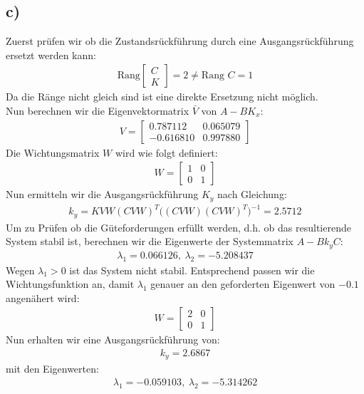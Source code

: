 \documentclass[11pt]{scrartcl} %
\begin{document}
\subsection*{c)}
Zuerst prüfen wir ob die Zustandsrückführung durch eine Ausgangsrückführung ersetzt werden kann:
\begin{align*}
	\text{Rang}\begin{bmatrix}C\\K\end{bmatrix}=2\neq\text{Rang }C=1
\end{align*}
Da die Ränge nicht gleich sind ist eine direkte Ersetzung nicht möglich.\\
Nun berechnen wir die Eigenvektormatrix $\bar{V}$ von $A-BK_x$:
\begin{align*}
	V=\begin{bmatrix}0.787112&0.065079\\-0.616810&0.997880\end{bmatrix}
\end{align*}
Die Wichtungsmatrix $W$ wird wie folgt definiert:
\begin{align*}
	W=\begin{bmatrix}1&0\\0&1\end{bmatrix}
\end{align*}
Nun ermitteln wir die Ausgangsrückführung $K_y$ nach Gleichung:
\begin{align*}
	k_y=KVW(CVW)^T\bigl((CVW)(CVW)^T\bigr)^{-1}=2.5712
\end{align*}
Um zu Prüfen ob die Güteforderungen erfüllt werden, d.h. ob das resultierende System stabil ist, berechnen wir die Eigenwerte der Systemmatrix $A-Bk_yC$:
\begin{align*}
	\lambda_1=0.066126,\hspace{3pt}\lambda_2=-5.208437
\end{align*}
Wegen $\lambda_1>0$ ist das System nicht stabil. Entsprechend passen wir die Wichtungsfunktion an, damit $\lambda_1$ genauer an den geforderten Eigenwert von $-0.1$ angenähert wird:
\begin{align*}
	W=\begin{bmatrix}2&0\\0&1\end{bmatrix}
\end{align*}
Nun erhalten wir eine Ausgangsrückführung von:
\begin{align*}
	k_y=2.6867
\end{align*}
mit den Eigenwerten:
\begin{align*}
	\lambda_1=-0.059103,\hspace{3pt}\lambda_2=-5.314262
\end{align*}
\end{document}
